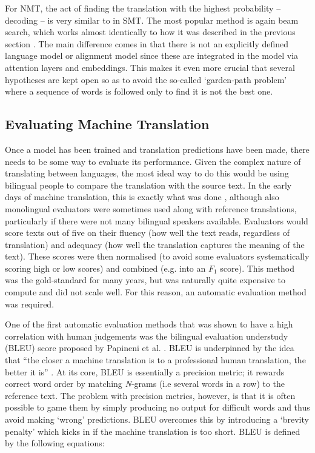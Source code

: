 \documentclass[11pt]{article}
\begin{document}
\bigskip

For NMT, the act of finding the translation with the highest probability -- decoding -- is very similar to in SMT. The most popular method is again beam search, which works almost identically to how it was described in the previous section \citep[ch. 9]{koehn2020}. The main difference comes in that there is not an explicitly defined language model or alignment model since these are integrated in the model via attention layers and embeddings. This makes it even more crucial that several hypotheses are kept open so as to avoid the so-called ‘garden-path problem’ where a sequence of words is followed only to find it is not the best one.

\subsection{Evaluating Machine Translation}

Once a model has been trained and translation predictions have been made, there needs to be some way to evaluate its performance. Given the complex nature of translating between languages, the most ideal way to do this would be using bilingual people to compare the translation with the source text. In the early days of machine translation, this is exactly what was done \citep{white-etal-1994-arpa}, although also monolingual evaluators were sometimes used along with reference translations, particularly if there were not many bilingual speakers available. Evaluators would score texts out of five on their fluency (how well the text reads, regardless of translation) and adequacy (how well the translation captures the meaning of the text). These scores were then normalised (to avoid some evaluators systematically scoring high or low scores) and combined (e.g. into an $F_1$ score). This method was the gold-standard for many years, but was naturally quite expensive to compute and did not scale well. For this reason, an automatic evaluation method was required.

\bigskip

One of the first automatic evaluation methods that was shown to have a high correlation with human judgements was the bilingual evaluation understudy (BLEU) score proposed by Papineni et al. \citeyearpar{papineni-etal-2002-bleu}. BLEU is underpinned by the idea that “the closer a machine translation is to a professional human translation, the better it is” \citep[p. 311]{papineni-etal-2002-bleu}. At its core, BLEU is essentially a precision metric; it rewards correct word order by matching \textit{N}-grams (i.e several words in a row) to the reference text. The problem with precision metrics, however, is that it is often possible to game them by simply producing no output for difficult words and thus avoid making `wrong' predictions. BLEU overcomes this by introducing a ‘brevity penalty’ which kicks in if the machine translation is too short. BLEU is defined by the following equations:
\end{document}
